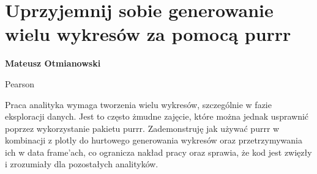 \documentclass[\main/boa.tex]{subfiles}
\begin{document}
\section{Uprzyjemnij sobie generowanie wielu wykresów za pomocą purrr}

\begin{minipage}{0.915\textwidth}
	\centering
  {\bf {}  Mateusz Otmianowski}
\end{minipage}



\begin{affiliations}
\begin{minipage}{0.915\textwidth}
\centering
Pearson \\[-2pt]
\end{minipage}
\end{affiliations}

\vskip 0.3cm

Praca analityka wymaga tworzenia wielu wykresów, szczególnie w fazie eksploracji danych. Jest to często żmudne zajęcie, które można jednak usprawnić poprzez wykorzystanie pakietu purrr. Zademonstruję jak używać purrr w kombinacji z plotly do hurtowego generowania wykresów oraz przetrzymywania ich w data frame’ach, co ogranicza nakład pracy oraz sprawia, że kod jest zwięzły i zrozumiały dla pozostałych analityków. 
\end{document}
